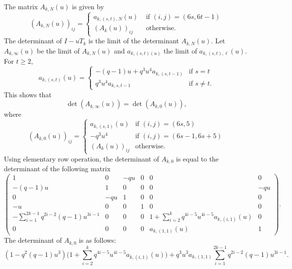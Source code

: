 \documentclass[11pt]{amsart}
\theoremstyle{definition}
\theoremstyle{remark}
\numberwithin{equation}{section}
\begin{document}
The matrix $A_{k,N}(u)$ is given by
\begin{equation*}
(A_{k,N}(u))_{ij}=\begin{cases}a_{k,(s,t),N}(u)&\text{ if }(i,j)=(6s,6t-1)\\
(A_{k}(u))_{ij}&\text{ otherwise}.\end{cases}
\end{equation*}
The determinant of $I-uT_k$ is the limit of the determinant $A_{k,N}(u)$. Let $A_{k,\infty}(u)$ be the limit of $A_{k,N}(u)$ and $a_{k,(s,t)(u)}$ the limit of $a_{k,(s,t),\ell}(u)$. For $t\geq 2$, 
\begin{equation*}
a_{k,{(s,t)}}(u)=\begin{cases}
-(q-1)u+q^3u^4a_{k,(s,t-1)}&\text{if }s=t\\
q^3u^4a_{k,{s,t-1}}&\text{if }s\neq t.
\end{cases}
\end{equation*}
This shows that 
$$\det (A_{k,\infty}(u))=\det( A_{k,0}(u)),$$
where
\begin{equation*}
(A_{k,0}(u))_{ij}=\begin{cases}
a_{k,(s,1)}(u)&\text{if }(i,j)=(6s,5)\\
-q^3u^4&\text{if }(i,j)=(6s-1,6s+5)\\
(A_{k}(u))_{ij}&\text{otherwise}.
\end{cases}
\end{equation*}
Using elementary row operation, the determinant of $A_{k,0}$ is equal to the determinant of the following matrix
\begin{equation*}
\begin{pmatrix}
1                        &0    &-qu&0&0&0\\
-(q-1)u               &1   &0    &0&0&-qu\\
0                        &-qu&1     &0&0&0\\
-u                       &0   &0      &1&0&0\\
-\sum_{i=1}^{2k-1}q^{2i-2}(q-1)u^{3i-1}&0&0&0&1+\sum_{i=2}^{k}q^{4i-5}u^{4i-5}a_{k,(i,1)}(u)&0\\
0&0&0&0&a_{k,(1,1)}(u)&1
\end{pmatrix}.
\end{equation*}
The determinant of $A_{k,0}$ is as follows:
\begin{equation*}
(1-q^2(q-1)u^3)\biggl(1+\sum_{i=2}^{k}q^{4i-5}u^{4i-5}a_{k,(i,1)}(u)\biggr)+q^3u^3a_{k,(1,1)}\sum_{i=1}^{2k-1}q^{2i-2}(q-1)u^{3i-1}.
\end{equation*}
\end{document}
